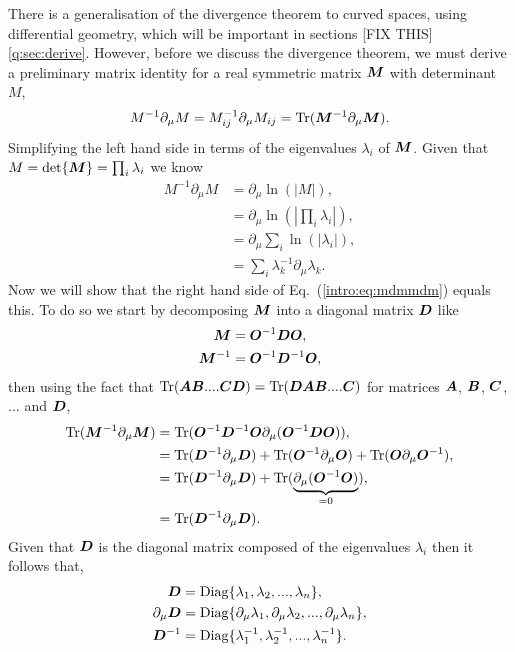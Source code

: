 There is a generalisation of the divergence theorem to curved spaces, using differential geometry, which will be important in sections [FIX THIS]\ref{q:sec:derive}. However, before we discuss the divergence theorem, we must derive a preliminary matrix identity for a real symmetric matrix $\boldsymbol{M}$ with determinant $M$,
\begin{equation}\label{intro:eq:mdmmdm}
M^{-1} \partial_\mu M = M^{-1}_{ij} \partial_\mu M_{ij} = \mathrm{Tr}(\boldsymbol{M}^{-1} \partial_\mu \boldsymbol{M}).
\end{equation}
Simplifying the left hand side in terms of the eigenvalues $\lambda_i$ of $\boldsymbol{M}$. Given that $M=\det{\boldsymbol{M}}=\prod_i \lambda_i$ we know
\begin{align}
M^{-1} \partial_\mu M &= \partial_\mu \ln(|M|) ,\\
&= \partial_\mu \ln\left(\left| \prod_i \lambda_i\right|\right) ,\\
&= \partial_\mu \sum_i \ln(\left|  \lambda_i\right|) ,\\
&= \sum_i \lambda_k^{-1}\partial_\mu \lambda_k. 
\end{align}
Now we will show that the right hand side of Eq.~(\ref{intro:eq:mdmmdm}) equals this. To do so we start by decomposing $\boldsymbol{M}$ into a diagonal matrix $\boldsymbol{D}$ like
\begin{align}
\boldsymbol{M} &= \boldsymbol{O}^{-1} \boldsymbol{D} \boldsymbol{O},\\
\boldsymbol{M}^{-1} &= \boldsymbol{O}^{-1} \boldsymbol{D}^{-1} \boldsymbol{O},
\end{align}
then using the fact that $\mathrm{Tr}(\boldsymbol{A} \boldsymbol{B} .... \boldsymbol{C}\boldsymbol{D}) = \mathrm{Tr}(\boldsymbol{D}\boldsymbol{A} \boldsymbol{B} .... \boldsymbol{C})$ for matrices $\boldsymbol{A}$, $ \boldsymbol{B}$, $ \boldsymbol{C}$, $...$ and $\boldsymbol{D}$,
\begin{align}
\mathrm{Tr}(\boldsymbol{M}^{-1} \partial_\mu \boldsymbol{M}) &= \mathrm{Tr}(\boldsymbol{O}^{-1} \boldsymbol{D}^{-1} \boldsymbol{O} \partial_\mu (\boldsymbol{O}^{-1} \boldsymbol{D} \boldsymbol{O})) ,\\
&= \mathrm{Tr}(\boldsymbol{D}^{-1} \partial_\mu \boldsymbol{D}) + \mathrm{Tr}(\boldsymbol{O}^{-1} \partial_\mu \boldsymbol{O}) +\mathrm{Tr}(\boldsymbol{O} \partial_\mu \boldsymbol{O}^{-1}) , \\
&= \mathrm{Tr}(\boldsymbol{D}^{-1} \partial_\mu \boldsymbol{D}) + \mathrm{Tr}( \underbrace{\partial_\mu (\boldsymbol{O}^{-1}\boldsymbol{O})}_{=0}) , \\
&= \mathrm{Tr}(\boldsymbol{D}^{-1} \partial_\mu \boldsymbol{D}) .
\end{align}
Given that $\boldsymbol{D}$ is the diagonal matrix composed of the eigenvalues $\lambda_i$ then it follows that,
\begin{align}
\boldsymbol{D} &= \mathrm{Diag}\{\lambda_1,\lambda_2,...,\lambda_n\} ,\\
\partial_\mu\boldsymbol{D} &= \mathrm{Diag}\{\partial_\mu\lambda_1,\partial_\mu\lambda_2,...,\partial_\mu\lambda_n\} ,\\
\boldsymbol{D}^{-1} &= \mathrm{Diag}\{\lambda^{-1}_1,\lambda^{-1}_2,...,\lambda^{-1}_n\} .
\end{align}
